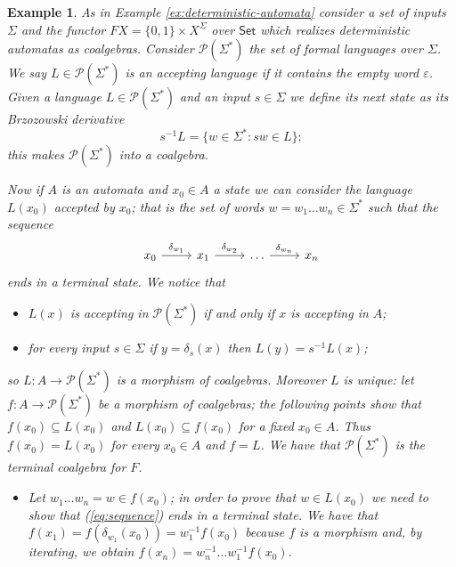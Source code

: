 \documentclass[letterpaper, 11pt, oneside]{memoir}
\theoremstyle{myteo}
\newtheorem{example}[theorem]{Example}
\numberwithin{equation}{section}
\newcommand{\Set}{\textsf{Set}}
\begin{document}
\begin{example}
  As in Example \ref{ex:deterministic-automata} consider a set of inputs \(\Sigma\) and the functor \(FX = \{0, 1\} \times X^\Sigma\) over \(\Set\) which realizes deterministic automatas as coalgebras.
  Consider \(\mathcal{P}(\Sigma^*)\) the set of formal languages over \(\Sigma\).
  We say \(L\in \mathcal{P}(\Sigma^*)\) is an accepting language if it contains the empty word \(\varepsilon\).
  Given a language \(L \in \mathcal{P}(\Sigma^*)\) and an input \(s \in \Sigma\) we define its next state as its Brzozowski derivative
  \begin{equation*}
    s^{-1}L = \{w \in \Sigma^* : sw \in L\};
  \end{equation*}
  this makes \(\mathcal{P}(\Sigma^*)\) into a coalgebra.

  Now if \(A\) is an automata and \(x_0 \in A\) a state we can consider the language \(L(x_0)\) accepted by \(x_0\); that is the set of words \(w = w_1\ldots w_n \in \Sigma^*\) such that the sequence
  \begin{equation}
    \label{eq:sequence}
    \begin{tikzcd}[sep=normal]
      x_0 \ar[r, "\delta_{w_1}"] & x_1 \ar[r, "\delta_{w_2}"] & \ldots \ar[r, "\delta_{w_{n}}"] & x_n
    \end{tikzcd}
  \end{equation}
  ends in a terminal state.
  We notice that
  \begin{itemize}
  \item[1.] \(L(x)\) is accepting in \(\mathcal{P}(\Sigma^*)\) if and only if \(x\) is accepting in \(A\);
  \item[2.] for every input \(s \in \Sigma\) if \(y = \delta_s(x)\) then \(L(y) = s^{-1}L(x)\);
  \end{itemize}
  so \(L: A \to \mathcal{P}(\Sigma^*)\) is a morphism of coalgebras. Moreover \(L\) is unique: let \(f: A \to \mathcal{P}(\Sigma^*)\) be a morphism of coalgebras; the following points show that \(f(x_0) \subseteq L(x_0)\) and \(L(x_0) \subseteq f(x_0)\) for a fixed \(x_0 \in A\). Thus \(f(x_0) = L(x_0)\) for every \(x_0 \in A\) and \(f = L\).
  We have that \(\mathcal{P}(\Sigma^*)\) is the terminal coalgebra for \(F\).
  \begin{itemize}
  \item[a.] Let \(w_1\ldots w_n = w \in f(x_0)\); in order to prove that \(w \in L(x_0)\) we need to show that (\ref{eq:sequence}) ends in a terminal state.
    We have that \(f(x_1) = f(\delta_{w_1}(x_0)) = w_1^{-1}f(x_0)\) because \(f\) is a morphism and, by iterating, we obtain \(f(x_n) = w_n^{-1}\ldots w_1^{-1}f(x_0)\).

\end{itemize}
\end{example}
\end{document}
